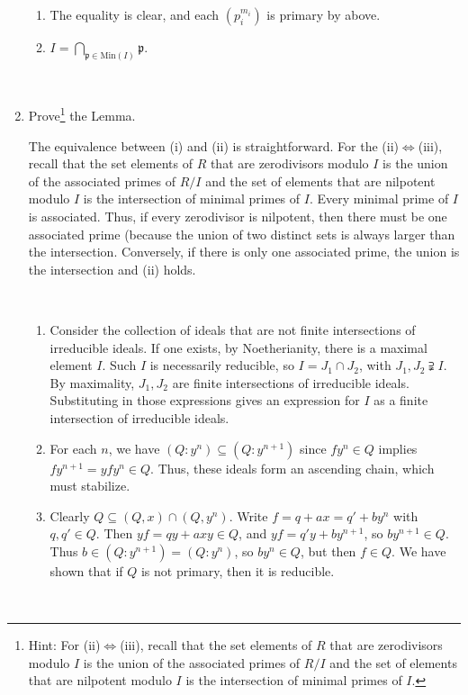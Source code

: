 \documentclass[12pt]{amsart}
\newcommand{\Bold}[1]{\contour{black}{#1}}
\newcommand{\p}{\mathfrak{p}}
\newcommand{\Min}{\mathrm{Min}}
\renewcommand{\1}{\mathbbm{1}}
\newcommand{\solution}[1]{\ifthenelse {\equal{\displaysol}{1}} {\begin{framed}{\color{meretale}\noindent #1}\end{framed}} { \ }}
\newcommand\itemA{\stepcounter{enumi}\item[{\Bold{(\theenumi)}}]}
\newcommand\itema{\stepcounter{enumii}\item[{\Bold{(\theenumii)}}]}
\begin{document}
\begin{enumerate}
\solution{
\begin{enumerate}
\itema The equality is clear, and each $(p_i^{m_i})$ is primary by above.
\itema $I = \bigcap_{\p \in \Min(I)} \p$.
\end{enumerate}
}


\itemA Prove\footnote{Hint: For (ii)$\Leftrightarrow$(iii), recall that the set elements of $R$ that are zerodivisors modulo $I$ is the union of the associated primes of $R/I$ and the set of elements that are nilpotent modulo $I$ is the intersection of minimal primes of $I$.} the Lemma.

\solution{The equivalence between (i) and (ii) is straightforward. For the (ii)$\Leftrightarrow$(iii), recall that the set elements of $R$ that are zerodivisors modulo $I$ is the union of the associated primes of $R/I$ and the set of elements that are nilpotent modulo $I$ is the intersection of minimal primes of $I$. Every minimal prime of $I$ is associated. Thus, if every zerodivisor is nilpotent, then there must be one associated prime (because the union of two distinct sets is always larger than the intersection. Conversely, if there is only one associated prime, the union is the intersection and (ii) holds.} 


\solution{
\begin{enumerate}
\itema Consider the collection of ideals that are not finite intersections of irreducible ideals. If one exists, by Noetherianity, there is a maximal element $I$. Such $I$ is necessarily reducible, so $I= J_1 \cap J_2$, with $J_1,J_2 \supsetneqq I$. By maximality, $J_1,J_2$ are finite intersections of irreducible ideals. Substituting in those expressions gives an expression for $I$ as a finite intersection of irreducible ideals. 
\itema For each $n$, we have $(Q:y^n) \subseteq (Q:y^{n+1})$ since $fy^{n}\in Q$ implies $fy^{n+1} = y fy^n \in Q$. Thus, these ideals form an ascending chain, which must stabilize.
\itema Clearly $Q  \subseteq (Q,x) \cap (Q,y^n)$. Write $f=q+ax = q' + by^n$ with $q,q'\in Q$. Then $yf = qy + axy \in Q$, and $yf = q'y+by^{n+1}$, so $by^{n+1}\in Q$. Thus $b\in (Q:y^{n+1})= (Q:y^n)$, so $by^n\in Q$, but then $f\in Q$. We have shown that if $Q$ is not primary, then it is reducible.
\end{enumerate}
}


\end{enumerate}
\end{document}
